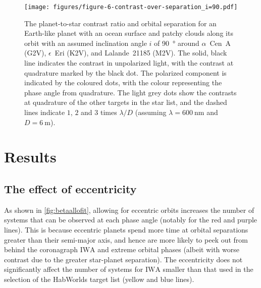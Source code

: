 \documentclass[usenatbib]{mnras}
\newcommand{\IWA}{\ensuremath{\mathrm{IWA}}\xspace}
\newcommand{\HWO}{HabWorlds\xspace}
\begin{document}
\begin{figure*}
    \centering
    \texttt{[image: figures/figure-6-contrast-over-separation\_i=90.pdf]}
    \caption{
        The planet-to-star contrast ratio and orbital separation for an Earth-like planet with an ocean surface and patchy clouds along its orbit with an assumed inclination angle $i$ of \qty{90}{\degree} around $\alpha$~Cen~A (G2V), $\epsilon$~Eri (K2V), and Lalande~21185 (M2V).
        The solid, black line indicates the contrast in unpolarized light, with the contrast at quadrature marked by the black dot.
        The polarized component is indicated by the coloured dots, with the colour representing the phase angle from quadrature.
        The light grey dots show the contrasts at quadrature of the other targets in the star list, and the dashed lines indicate $1$, $2$ and $3$ times $\lambda / D$ (assuming $\lambda = \qty{600}{\nano\meter}$ and $D = \qty{6}{\meter}$).
    }
    \label{fig:contrasts}
\end{figure*}




\section{Results}
\label{sec:3}

\subsection{The effect of eccentricity}
\label{sec:result_eccentricity}

As shown in \cref{fig:betaallofit}, allowing for eccentric orbits increases the number of systems that can be observed at each phase angle (notably for the red and purple lines). 
This is because eccentric planets spend more time at orbital separations greater than their semi-major axis, and hence are more likely to peek out from behind the coronagraph \IWA and extreme orbital phases (albeit with worse contrast due to the greater star-planet separation).
The eccentricity does not significantly affect the number of systems for \IWA smaller than that used in the selection of the \HWO target list (yellow and blue lines). 
\end{document}
